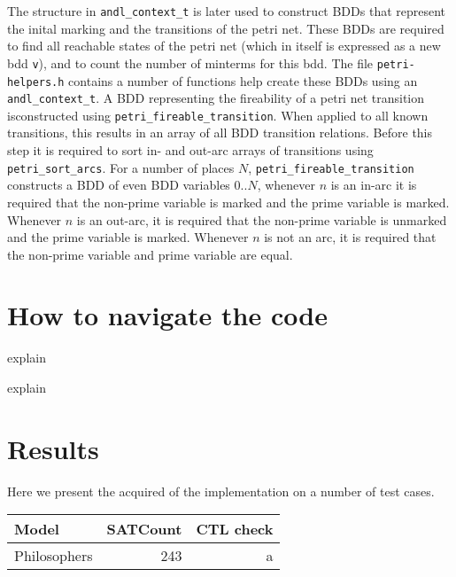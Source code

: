 \documentclass[twoside, a4paper]{article}
\begin{document}
The structure in \texttt{andl\_context\_t} is later used to construct BDDs that represent the inital marking and the transitions of the petri net. These BDDs are required to find all reachable states of the petri net (which in itself is expressed as a new bdd \texttt{v}), and to count the number of minterms for this bdd. The file \texttt{petri-helpers.h} contains a number of functions help create these BDDs using an \texttt{andl\_context\_t}. A BDD representing the fireability of a petri net transition isconstructed using \texttt{petri\_fireable\_transition}. When applied to all known transitions, this results in an array of all BDD transition relations. Before this step it is required to sort in- and out-arc arrays of transitions using \texttt{petri\_sort\_arcs}. For a number of places $N$, \texttt{petri\_fireable\_transition} constructs a BDD of even BDD variables $0..N$, whenever $n$ is an in-arc it is required that the non-prime variable is marked and the prime variable is marked. Whenever $n$ is an out-arc, it is required that the non-prime variable is unmarked and the prime variable is marked. Whenever $n$ is not an arc, it is required that the non-prime variable and prime variable are equal.



\section{How to navigate the code}
\begin{description}[align=left]
\item [bdd-util.c:50] explain
\item [petri-util.c:50] explain
\end{description}


\section{Results}
Here we present the acquired of the implementation on a number of test cases.

\begin{tabular}[pos]{l | r | r}
  Model & SATCount & CTL check \\
  \hline
  Philosophers & 243 & a\\
\end{tabular}


\printbibliography
\end{document}
